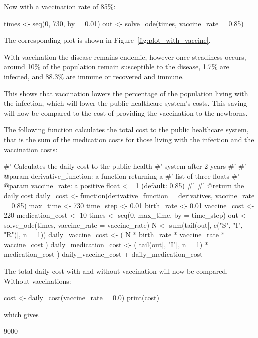 Now with a vaccination rate of 85\%:

\begin{Rin}
times <- seq(0, 730, by = 0.01)
out <- solve_ode(times, vaccine_rate = 0.85)
\end{Rin}

The corresponding plot is shown in Figure~\ref{fig:plot_with_vaccine}.

With vaccination the disease remains endemic, however once steadiness occurs,
around 10\% of the population remain susceptible to the disease, 1.7\% are
infected, and 88.3\% are immune or recovered and immune.

This shows that vaccination lowers the percentage of the population living with
the infection, which will lower the public healthcare system's costs.
This saving will now be compared to the cost of providing the vaccination to the
newborns.

The following function calculates the total cost to the public healthcare
system, that is the sum of the medication costs for those living with the
infection and the vaccination costs:

\begin{Rin}
#' Calculates the daily cost to the public health
#' system after 2 years
#'
#' @param derivative_function: a function returning a
#'                             list of three floats
#' @param vaccine_rate: a positive float <= 1 (default: 0.85)
#'
#' @return the daily cost
daily_cost <- function(derivative_function = derivatives,
                       vaccine_rate = 0.85){
  max_time <- 730
  time_step <- 0.01
  birth_rate <- 0.01
  vaccine_cost <- 220
  medication_cost <- 10
  times <- seq(0, max_time, by = time_step)
  out <- solve_ode(times, vaccine_rate = vaccine_rate)
  N <- sum(tail(out[, c("S", "I", "R")], n = 1))
  daily_vaccine_cost <- (
    N * birth_rate * vaccine_rate * vaccine_cost
  )
  daily_medication_cost <- (
    tail(out[, "I"], n = 1) * medication_cost
  )
  daily_vaccine_cost + daily_medication_cost
}
\end{Rin}

The total daily cost with and without vaccination will now be compared. Without
vaccinations:

\begin{Rin}
cost <- daily_cost(vaccine_rate = 0.0)
print(cost)
\end{Rin}

which gives

\begin{Rout}
[1] 9000
\end{Rout}

